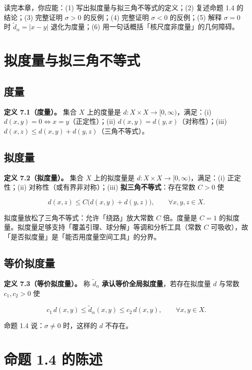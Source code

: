 \documentclass[a4paper,11pt,openany]{ctexbook}
\numberwithin{equation}{chapter}
\numberwithin{figure}{chapter}
\numberwithin{table}{chapter}
\begin{document}
读完本章，你应能：(1) 写出拟度量与拟三角不等式的定义；(2) 复述命题 1.4 的结论；(3) 完整证明 $\sigma>0$ 的反例；(4) 完整证明 $\sigma<0$ 的反例；(5) 解释 $\sigma=0$ 时 $\widetilde d_\alpha=|x-y|$ 退化为度量；(6) 用一句话概括「核尺度非度量」的几何障碍。

\section{拟度量与拟三角不等式}

\subsection{度量}

\textbf{定义 7.1（度量）。} 集合 $X$ 上的度量是 $d:X\times X\to[0,\infty)$，满足：(i) $d(x,y)=0\iff x=y$（正定性）；(ii) $d(x,y)=d(y,x)$（对称性）；(iii) $d(x,z)\le d(x,y)+d(y,z)$（三角不等式）。

\subsection{拟度量}

\textbf{定义 7.2（拟度量）。} 集合 $X$ 上的拟度量是 $d:X\times X\to[0,\infty)$，满足：(i) 正定性；(ii) 对称性（或有界非对称）；(iii) \textbf{拟三角不等式}：存在常数 $C>0$ 使

$$d(x,z)\le C\bigl(d(x,y)+d(y,z)\bigr),\qquad\forall x,y,z\in X.$$

\begin{intuitionbox}
拟度量放松了三角不等式：允许「绕路」放大常数 $C$ 倍。度量是 $C=1$ 的拟度量。拟度量足够支持「覆盖引理、球分解」等调和分析工具（常数 $C$ 可吸收），故「是否拟度量」是「能否用度量空间工具」的分界。
\end{intuitionbox}

\subsection{等价拟度量}

\textbf{定义 7.3（等价拟度量）。} 称 $\widetilde d_\alpha$ \textbf{承认等价全局拟度量}，若存在拟度量 $d$ 与常数 $c_1,c_2>0$ 使

$$c_1\,d(x,y)\le\widetilde d_\alpha(x,y)\le c_2\,d(x,y),\qquad\forall x,y\in X.$$

命题 1.4 说：$\sigma\neq0$ 时，这样的 $d$ 不存在。

\section{命题 1.4 的陈述}
\end{document}
